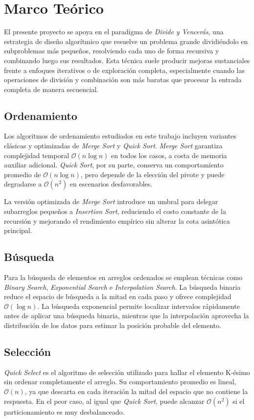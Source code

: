 \section{Marco Teórico}\label{sec:marco}

El presente proyecto se apoya en el paradigma de \textit{Divide y Vencerás}, una estrategia de diseño algorítmico que resuelve un problema grande dividiéndolo en subproblemas más pequeños, resolviendo cada uno de forma recursiva y combinando luego sus resultados. Esta técnica suele producir mejoras sustanciales frente a enfoques iterativos o de exploración completa, especialmente cuando las operaciones de división y combinación son más baratas que procesar la entrada completa de manera secuencial.

\subsection{Ordenamiento}
Los algoritmos de ordenamiento estudiados en este trabajo incluyen variantes clásicas y optimizadas de \textit{Merge Sort} y \textit{Quick Sort}. \textit{Merge Sort} garantiza complejidad temporal $\mathcal{O}(n \log n)$ en todos los casos, a costa de memoria auxiliar adicional. \textit{Quick Sort}, por su parte, conserva un comportamiento promedio de $\mathcal{O}(n \log n)$, pero depende de la elección del pivote y puede degradarse a $\mathcal{O}(n^2)$ en escenarios desfavorables.

La versión optimizada de \textit{Merge Sort} introduce un umbral para delegar subarreglos pequeños a \textit{Insertion Sort}, reduciendo el costo constante de la recursión y mejorando el rendimiento empírico sin alterar la cota asintótica principal.

\subsection{Búsqueda}
Para la búsqueda de elementos en arreglos ordenados se emplean técnicas como \textit{Binary Search}, \textit{Exponential Search} e \textit{Interpolation Search}. La búsqueda binaria reduce el espacio de búsqueda a la mitad en cada paso y ofrece complejidad $\mathcal{O}(\log n)$. La búsqueda exponencial permite localizar intervalos rápidamente antes de aplicar una búsqueda binaria, mientras que la interpolación aprovecha la distribución de los datos para estimar la posición probable del elemento.

\subsection{Selección}
\textit{Quick Select} es el algoritmo de selección utilizado para hallar el elemento K-ésimo sin ordenar completamente el arreglo. Su comportamiento promedio es lineal, $\mathcal{O}(n)$, ya que descarta en cada iteración la mitad del espacio que no contiene la respuesta. En el peor caso, al igual que \textit{Quick Sort}, puede alcanzar $\mathcal{O}(n^2)$ si el particionamiento es muy desbalanceado.

